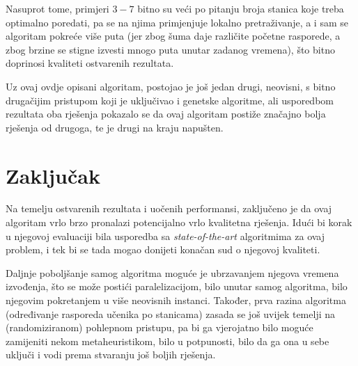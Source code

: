 \documentclass[times, utf8, seminar, numeric]{fer}
\begin{document}
Nasuprot tome, primjeri $3-7$ bitno su veći po pitanju broja stanica koje treba optimalno poredati, pa se na njima primjenjuje lokalno pretraživanje, a i sam se algoritam pokreće više puta (jer zbog šuma daje različite početne rasporede, a zbog brzine se stigne izvesti mnogo puta unutar zadanog vremena), što bitno doprinosi kvaliteti ostvarenih rezultata.

Uz ovaj ovdje opisani algoritam, postojao je još jedan drugi, neovisni, s bitno drugačijim pristupom koji je uključivao i genetske algoritme, ali usporedbom rezultata oba rješenja pokazalo se da ovaj algoritam postiže značajno bolja rješenja od drugoga, te je drugi na kraju napušten.

\chapter{Zaključak}

Na temelju ostvarenih rezultata i uočenih performansi, zaključeno je da ovaj  algoritam vrlo brzo pronalazi potencijalno vrlo kvalitetna rješenja. Idući bi korak u njegovoj evaluaciji bila usporedba sa \textit{state-of-the-art} algoritmima za ovaj problem, i tek bi se tada mogao donijeti konačan sud o njegovoj kvaliteti.

Daljnje poboljšanje samog algoritma moguće je ubrzavanjem njegova vremena izvođenja, što se može postići paralelizacijom, bilo unutar samog algoritma, bilo njegovim pokretanjem u više neovisnih instanci. Također, prva razina algoritma (određivanje rasporeda učenika po stanicama) zasada se još uvijek temelji na (randomiziranom) pohlepnom pristupu, pa bi ga vjerojatno bilo moguće zamijeniti nekom metaheuristikom, bilo u potpunosti, bilo da ga ona u sebe uključi i vodi prema stvaranju još boljih rješenja.

%
%
\end{document}

